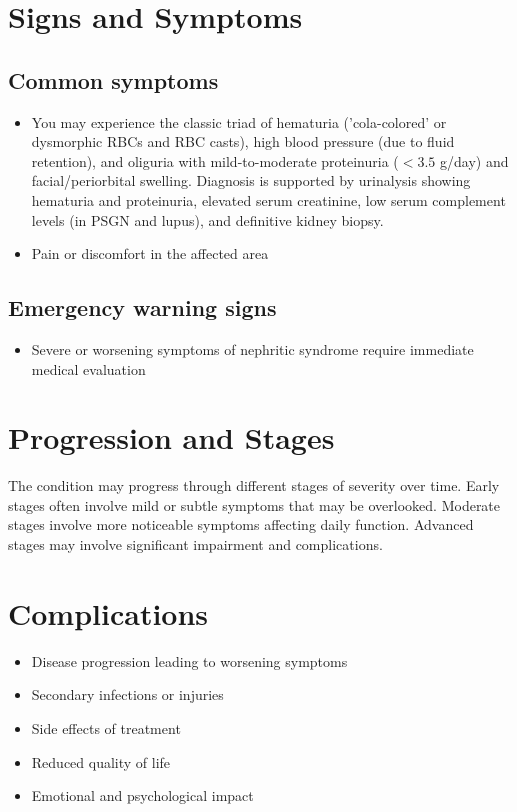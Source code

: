 \section{Signs and Symptoms}

\subsection{Common symptoms}
\begin{itemize}[noitemsep]
  \item You may experience the classic triad of hematuria ('cola-colored' or dysmorphic RBCs and RBC casts), high blood pressure (due to fluid retention), and oliguria with mild-to-moderate proteinuria ($<3.5$ g/day) and facial/periorbital swelling. Diagnosis is supported by urinalysis showing hematuria and proteinuria, elevated serum creatinine, low serum complement levels (in PSGN and lupus), and definitive kidney biopsy.

  \item Pain or discomfort in the affected area
  \end{itemize}

\subsection{Emergency warning signs}
\begin{itemize}[noitemsep]
  \item Severe or worsening symptoms of nephritic syndrome require immediate medical evaluation
\end{itemize}
\section{Progression and Stages}
The condition may progress through different stages of severity over time. Early stages often involve mild or subtle symptoms that may be overlooked. Moderate stages involve more noticeable symptoms affecting daily function. Advanced stages may involve significant impairment and complications.
\section{Complications}
\begin{itemize}[noitemsep]
  \item Disease progression leading to worsening symptoms
  \item Secondary infections or injuries
  \item Side effects of treatment
  \item Reduced quality of life
  \item Emotional and psychological impact
\end{itemize}
